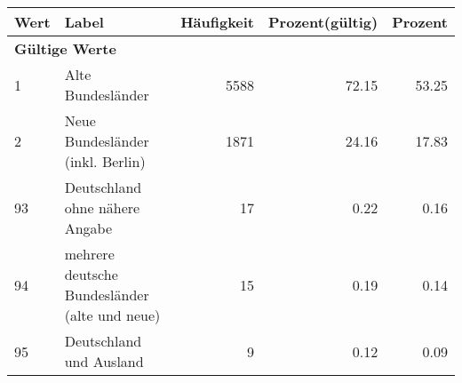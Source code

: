      \begin{longtable}{lXrrr}
     \toprule
     \textbf{Wert} & \textbf{Label} & \textbf{Häufigkeit} & \textbf{Prozent(gültig)} & \textbf{Prozent} \\
     \endhead
     \midrule
     \multicolumn{5}{l}{\textbf{Gültige Werte}}\\

     1 &
     \multicolumn{1}{X}{ Alte Bundesländer   } &


       \num{5588} &
       \num[round-mode=places,round-precision=2]{72.15} &
         \num[round-mode=places,round-precision=2]{53.25} \\

     2 &
     \multicolumn{1}{X}{ Neue Bundesländer (inkl. Berlin)   } &


       \num{1871} &
       \num[round-mode=places,round-precision=2]{24.16} &
         \num[round-mode=places,round-precision=2]{17.83} \\

     93 &
     \multicolumn{1}{X}{ Deutschland ohne nähere Angabe   } &


       \num{17} &
       \num[round-mode=places,round-precision=2]{0.22} &
         \num[round-mode=places,round-precision=2]{0.16} \\

     94 &
     \multicolumn{1}{X}{ mehrere deutsche Bundesländer (alte und neue)   } &


       \num{15} &
       \num[round-mode=places,round-precision=2]{0.19} &
         \num[round-mode=places,round-precision=2]{0.14} \\

     95 &
     \multicolumn{1}{X}{ Deutschland und Ausland   } &


       \num{9} &
       \num[round-mode=places,round-precision=2]{0.12} &
         \num[round-mode=places,round-precision=2]{0.09} \\


\end{longtable}
